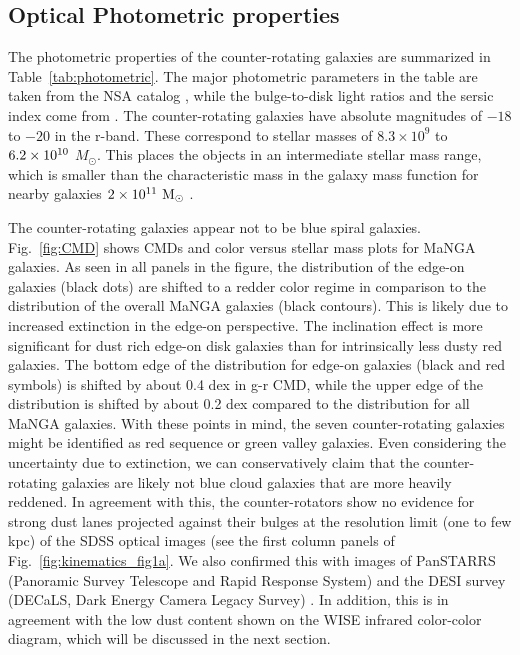 \documentclass[fleqn,usenatbib]{mnras}
\begin{document}
\subsection{Optical Photometric properties} \label{sec:photometric}

The photometric properties of the counter-rotating galaxies 
are summarized in Table~\ref{tab:photometric}. 
The major photometric parameters in the table are taken from the NSA catalog \citep{NSA}, 
while the bulge-to-disk light ratios and the sersic index come from \citet{Simard2011}. 
The counter-rotating galaxies have absolute magnitudes of 
$-18$ to $-20$ in the r-band.
These correspond to stellar masses of 
$8.3\times10^{9}$ to $\rm 6.2\times10^{10}$ $M_{\odot}$.
This places the objects in an intermediate stellar mass range,
which is smaller than the characteristic mass in the galaxy mass function 
for nearby galaxies $\rm 2\times10^{11}~M_{\odot}$ \citep{Baldry2008}.

The counter-rotating galaxies appear not to be blue spiral galaxies. 
Fig.~\ref{fig:CMD} shows CMDs and color versus stellar mass plots for MaNGA galaxies. 
As seen in all panels in the figure, the distribution of the 
edge-on galaxies (black dots) are shifted to a redder color regime
in comparison to the distribution of the overall MaNGA galaxies 
(black contours).
This is likely due to increased extinction in the edge-on perspective.
The inclination effect is more significant for dust rich edge-on disk galaxies 
than for intrinsically less dusty red galaxies.
The bottom edge of the distribution for edge-on galaxies 
(black and red symbols) 
is shifted by about 0.4 dex in g-r CMD,
while the upper edge of the distribution is shifted by about 0.2 dex 
compared to the distribution for all MaNGA galaxies.
With these points in mind, 
the seven counter-rotating galaxies 
might be identified as red sequence or green valley galaxies. 
Even considering the uncertainty due to extinction,
we can conservatively claim that 
the counter-rotating galaxies are likely not blue cloud galaxies 
that are more heavily reddened. 
In agreement with this, the counter-rotators show no evidence 
for strong dust lanes projected against their bulges 
at the resolution limit (one to few kpc) of the SDSS optical images 
(see the first column panels of Fig.~\ref{fig:kinematics_fig1a}.
We also confirmed this with images of PanSTARRS 
(Panoramic Survey Telescope and Rapid Response System) 
and the DESI survey (DECaLS, Dark Energy Camera Legacy Survey) \citep{PanSTARR, DeCALS}. 
In addition, this is in agreement with the low dust content shown 
on the WISE infrared color-color diagram, 
which will be discussed in the next section.
\end{document}
